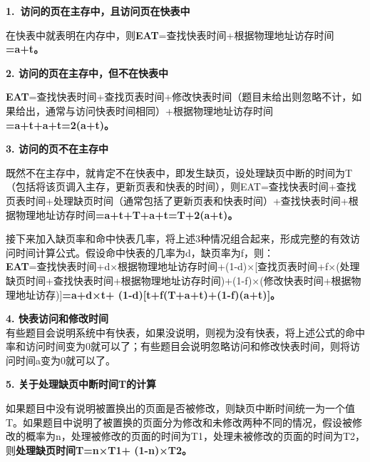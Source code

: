 \textbf{{1.~}{访问的页在主存中，且访问页在快表中}}

{在快表中就表明在内存中，则}\textbf{EAT}{=查找快表时间+根据物理地址访存时间}\textbf{={a+t}。}

{\textbf{2. 访问的页在主存中，但不在快表中}}

{\textbf{EAT}=查找快表时间+查找页表时间+修改快表时间（题目未给出则忽略不计，如果给出，通常与访问快表时间相同）+根据物理地址访存时间\textbf{={a+t+a+t=2(a+t)}。}}

\textbf{{3. 访问的页不在主存中}}

既然不在主存中，就肯定不在快表中，即发生缺页，设处理缺页中断的时间为T（包括将该页调入主存，更新页表和快表的时间），则EAT=查找快表时间+查找页表时间+处理缺页时间（通常包括了更新页表和快表时间）+查找快表时间+根据物理地址访存时间\textbf{={a+t+T+a+t=T+2(a+t)}。}

接下来加入缺页率和命中快表几率，将上述3种情况组合起来，形成完整的有效访问时间计算公式。假设命中快表的几率为d，缺页率为f，则：\\

\textbf{EAT}=查找快表时间+d×根据物理地址访存时间+(1-d)×{[}查找页表时间+f×(处理缺页时间+查找快表时间+根据物理地址访存时间)+(1-f)×(修改快表时间+根据物理地址访存){]}\textbf{={a+d×t+
(1-d){[}t+f(T+a+t)+(1-f)(a+t){]}}。}

\textbf{{4. 快表访问和修改时间}}\\

有些题目会说明系统中有快表，如果没说明，则视为没有快表，将上述公式的命中率和访问时间变为0就可以了；有些题目会说明忽略访问和修改快表时间，则将访问时间a变为0就可以了。

\textbf{{5. 关于处理缺页中断时间T的计算}}

如果题目中没有说明被置换出的页面是否被修改，则缺页中断时间统一为一个值T。如果题目中说明了被置换的页面分为修改和未修改两种不同的情况，假设被修改的概率为n，处理被修改的页面的时间为T1，处理未被修改的页面的时间为T2，则\textbf{{处理缺页时间T=n×T1+
(1-n)×T2}。}
